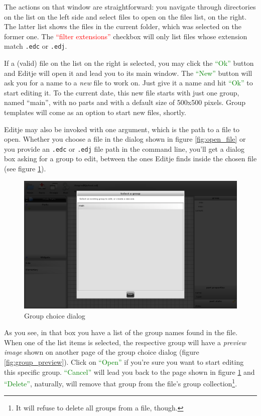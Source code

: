 \documentclass[a4paper]{profusion}
\newcommand{\GUICheckbox}[1]{\textcolor{red}{#1}}
\newcommand{\GUIButton}[1]{\textcolor{green}{#1}} %
\begin{document}
The actions on that window are straightforward: you navigate through
directories on the list on the left side and select files to open on
the files list, on the right. The latter list shows the files in the
current folder, which was selected on the former one. The
\GUICheckbox{``filter extensions''} checkbox will only list files
whose extension match \texttt{.edc} or \texttt{.edj}.

If a (valid) file on the list on the right is selected, you may click
the \GUIButton{``Ok''} button and Editje will open it and lead you to
its main window. The \GUIButton{``New''} button will ask you for a
name to a \emph{new} file to work on. Just give it a name and hit
\GUIButton{``Ok''} to start editing it. To the current date, this new
file starts with just one group, named ``main'', with no parts and
with a default size of 500x500 pixels. Group templates will come as an
option to start new files, shortly.

Editje may also be invoked with one argument, which is the path to a
file to open. Whether you choose a file in the dialog shown in figure
\ref{fig:open_file} or you provide an \texttt{.edc} or \texttt{.edj}
file path in the command line, you'll get a dialog box asking for a
group to edit, between the ones Editje finds inside the chosen file
(see figure \ref{fig:choose_group}).

\begin{figure}[h!]
  \centering
  \includegraphics[width=1.0\textwidth]{images/choose_group.png}
  \caption{Group choice dialog}
  \label{fig:choose_group}
\end{figure}

As you see, in that box you have a list of the group names found in
the file. When one of the list items is selected, the respective group
will have a \emph{preview image} shown on another page of the group
choice dialog (figure \ref{fig:group_preview}). Click on
\GUIButton{``Open''} if you're sure you want to start editing this
specific group. \GUIButton{``Cancel''} will lead you back to the page
shown in figure \ref{fig:choose_group} and \GUIButton{``Delete''},
naturally, will remove that group from the file's group
collection\footnote{It will refuse to delete all groups from a file,
  though.}.
\end{document}
